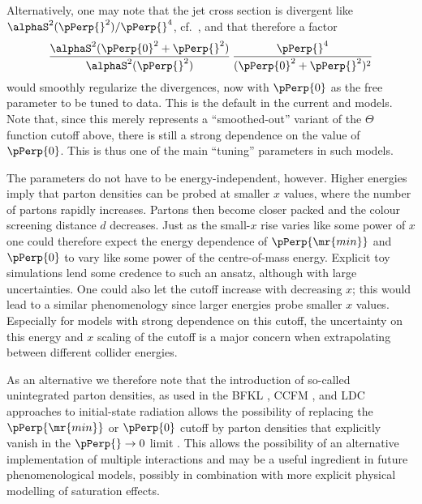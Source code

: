 Alternatively, one may note that the jet cross section is divergent
like $\alphaS^2(\pPerp{}^2)/\pPerp{}^4$, cf.~,
and that therefore a factor
\begin{equation}
\frac{\alphaS^2(\pPerp{0}^2 + \pPerp{}^2)}{\alphaS^2(\pPerp{}^2)} \,
\frac{\pPerp{}^4}{(\pPerp{0}^2 + \pPerp{}^2)^2}
\label{eq:ptzerodampen}
\end{equation}
would smoothly regularize the divergences, now with $\pPerp{0}$ as the
free parameter to be tuned to data. This is the default in
the current \pythia and \Sherpa models. Note that,
since this merely represents a ``smoothed-out''
variant of the $\Theta$ function cutoff above, there is still a strong
dependence on the value of $\pPerp{0}$. This is thus one of the main ``tuning''
parameters in such models.

The parameters do not have to be energy-independent, however.
Higher energies imply that parton densities can be probed at smaller
$x$ values, where the number of partons rapidly increases. Partons
then become closer packed and the colour screening distance $d$
decreases. Just as the small-$x$ rise varies like some power of $x$
one could therefore expect the energy dependence of $\pPerp{\mr{min}}$ and
$\pPerp{0}$ to vary like some power of the centre-of-mass energy. Explicit toy simulations
\cite{Dischler:2000pk} lend some credence to such an ansatz, although with
large uncertainties. One could also let the cutoff increase
with decreasing $x$; this would lead to a similar phenomenology since
larger energies probe smaller $x$ values. Especially for models with
strong dependence on this cutoff, the uncertainty on this
energy and $x$ scaling of the cutoff is a major concern when
extrapolating between different collider energies.

As an alternative we therefore
note that the introduction of so-called unintegrated parton
densities, as used in the BFKL \cite{Kuraev:1977fs,Balitsky:1978ic}, CCFM
\cite{Ciafaloni:1987ur,Catani:1989sg}, and LDC
\cite{Andersson:1995ju,Andersson:1997bx,Kharraziha:1997dn}
approaches to initial-state radiation allows the possibility of
replacing the $\pPerp{\mr{min}}$ or $\pPerp{0}$ cutoff by parton densities that
explicitly vanish in the $\pPerp{} \to 0$ limit
\cite{Gustafson:2002jy}. This allows the possibility of an
alternative implementation of multiple interactions
\cite{Gustafson:2002kz} and may be a useful ingredient in future
phenomenological models, possibly in combination with more explicit
physical modelling of saturation effects.

